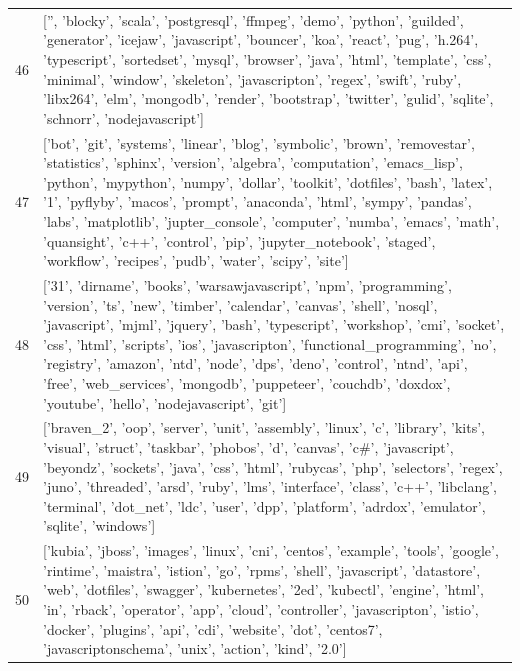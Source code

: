 \begin{center}
\begin{longtable}{|p{1.5cm}|p{12.5cm}|}
            46 & ['', 'blocky', 'scala', 'postgresql', 'ffmpeg', 'demo', 'python', 'guilded', 'generator', 'icejaw', 'javascript', 'bouncer', 'koa', 'react', 'pug', 'h.264', 'typescript', 'sortedset', 'mysql', 'browser', 'java', 'html', 'template', 'css', 'minimal', 'window', 'skeleton', 'javascripton', 'regex', 'swift', 'ruby', 'libx264', 'elm', 'mongodb', 'render', 'bootstrap', 'twitter', 'gulid', 'sqlite', 'schnorr', 'nodejavascript']  \\ 
            47 & ['bot', 'git', 'systems', 'linear', 'blog', 'symbolic', 'brown', 'removestar', 'statistics', 'sphinx', 'version', 'algebra', 'computation', 'emacs\_lisp', 'python', 'mypython', 'numpy', 'dollar', 'toolkit', 'dotfiles', 'bash', 'latex', '1', 'pyflyby', 'macos', 'prompt', 'anaconda', 'html', 'sympy', 'pandas', 'labs', 'matplotlib', 'jupter\_console', 'computer', 'numba', 'emacs', 'math', 'quansight', 'c++', 'control', 'pip', 'jupyter\_notebook', 'staged', 'workflow', 'recipes', 'pudb', 'water', 'scipy', 'site']  \\ 
            48 & ['31', 'dirname', 'books', 'warsawjavascript', 'npm', 'programming', 'version', 'ts', 'new', 'timber', 'calendar', 'canvas', 'shell', 'nosql', 'javascript', 'mjml', 'jquery', 'bash', 'typescript', 'workshop', 'cmi', 'socket', 'css', 'html', 'scripts', 'ios', 'javascripton', 'functional\_programming', 'no', 'registry', 'amazon', 'ntd', 'node', 'dps', 'deno', 'control', 'ntnd', 'api', 'free', 'web\_services', 'mongodb', 'puppeteer', 'couchdb', 'doxdox', 'youtube', 'hello', 'nodejavascript', 'git']  \\ 
            49 & ['braven\_2', 'oop', 'server', 'unit', 'assembly', 'linux', 'c', 'library', 'kits', 'visual', 'struct', 'taskbar', 'phobos', 'd', 'canvas', 'c\#', 'javascript', 'beyondz', 'sockets', 'java', 'css', 'html', 'rubycas', 'php', 'selectors', 'regex', 'juno', 'threaded', 'arsd', 'ruby', 'lms', 'interface', 'class', 'c++', 'libclang', 'terminal', 'dot\_net', 'ldc', 'user', 'dpp', 'platform', 'adrdox', 'emulator', 'sqlite', 'windows']  \\ 
            50 & ['kubia', 'jboss', 'images', 'linux', 'cni', 'centos', 'example', 'tools', 'google', 'rintime', 'maistra', 'istion', 'go', 'rpms', 'shell', 'javascript', 'datastore', 'web', 'dotfiles', 'swagger', 'kubernetes', '2ed', 'kubectl', 'engine', 'html', 'in', 'rback', 'operator', 'app', 'cloud', 'controller', 'javascripton', 'istio', 'docker', 'plugins', 'api', 'cdi', 'website', 'dot', 'centos7', 'javascriptonschema', 'unix', 'action', 'kind', '2.0']  \\ 

\end{longtable}
\end{center}
